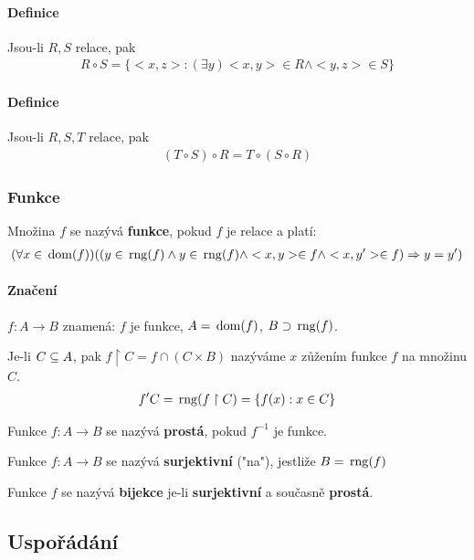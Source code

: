 \documentclass[a4paper,12pt,titlepage]{article}
\begin{document}
\paragraph{Definice}
Jsou-li $R, S$ relace, pak
\begin{align}
R \circ S = \{ <x,z> : (\exists y) <x,y> \in R \land <y,z> \in S \}
\end{align}
\paragraph{Definice}
Jsou-li $R, S, T$ relace, pak
\begin{align}
	(T \circ S) \circ R = T \circ (S \circ R)
\end{align}

\subsubsection{Funkce}
\setcounter{equation}{0}
Množina $f$ se nazývá \textbf{funkce}, pokud $f$ je relace a platí:
\begin{align}
	(\forall x \in \operatorname*{\,dom}(f))((y \in \operatorname*{\,rng}(f) \land y \in \operatorname*{\,rng}(f) \land <x,y> \in f
	\land <x,y'> \in f) \Rightarrow y = y')
\end{align}
\paragraph{Značení} $f: A \to B$ znamená: $f$ je funkce, $A = \operatorname*{\,dom}(f)$, $B \supset
\operatorname*{\,rng}(f)$.


Je-li $C \subseteq A$, pak $f \upharpoonright C = f \cap (C \times B)$ nazýváme $x$ zůžením funkce
$f$ na množinu $C$.
\begin{align}
f'C = \operatorname*{\,rng}(f \upharpoonright C) = \{ f(x): x \in C \}
\end{align}
\begin{description}
\item Funkce $f: A \to B$ se nazývá \textbf{prostá}, pokud $f^{-1}$ je funkce.
\item Funkce $f: A \to B$ se nazývá \textbf{surjektivní} ("na"), jestliže $B = \operatorname*{\,rng}(f)$
\item Funkce $f$ se nazývá \textbf{bijekce} je-li \textbf{surjektivní} a současně
\textbf{prostá}.
\end{description}


\subsection{Uspořádání}
\setcounter{equation}{0}
\end{document}
